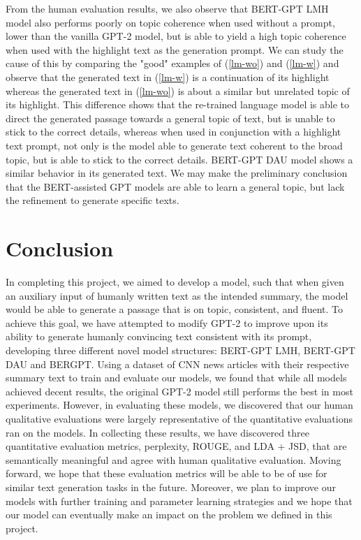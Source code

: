 \documentclass{article}
\begin{document}
From the human evaluation results, we also observe that BERT-GPT LMH model also performs poorly on topic coherence when used without a prompt, lower than the vanilla GPT-2 model, but is able to yield a high topic coherence when used with the highlight text as the generation prompt. We can study the cause of this by comparing the "good" examples of (\ref{lm-wo}) and (\ref{lm-w}) and observe that the generated text in (\ref{lm-w}) is a continuation of its highlight whereas the generated text in (\ref{lm-wo}) is about a similar but unrelated topic of its highlight. This difference shows that the re-trained language model is able to direct the generated passage towards a general topic of text, but is unable to stick to the correct details, whereas when used in conjunction with a highlight text prompt, not only is the model able to generate text coherent to the broad topic, but is able to stick to the correct details. BERT-GPT DAU model shows a similar behavior in its generated text. We may make the preliminary conclusion that the BERT-assisted GPT models are able to learn a general topic, but lack the refinement to generate specific texts. 






\section{Conclusion}

In completing this project, we aimed to develop a model, such that when given an auxiliary input of humanly written text as the intended summary, the model would be able to generate a passage that is on topic, consistent, and fluent. To achieve this goal, we have attempted to modify GPT-2 to improve upon its ability to generate humanly convincing text consistent with its prompt, developing three different novel model structures: BERT-GPT LMH, BERT-GPT DAU and BERGPT. Using a dataset of CNN news articles with their respective summary text to train and evaluate our models, we found that while all models achieved decent results, the original GPT-2 model still performs the best in most experiments. However, in evaluating these models, we discovered that our human qualitative evaluations were largely representative of the quantitative evaluations ran on the models. In collecting these results, we have discovered three quantitative evaluation metrics, perplexity, ROUGE, and LDA + JSD, that are semantically meaningful and agree with human qualitative evaluation. Moving forward, we hope that these evaluation metrics will be able to be of use for similar text generation tasks in the future. Moreover, we plan to improve our models with further training and parameter learning strategies and we hope that our model can eventually make an impact on the problem we defined in this project.
\end{document}
